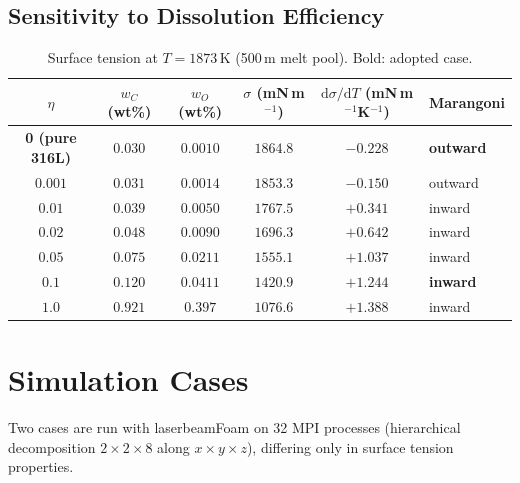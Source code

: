 \documentclass[11pt,a4paper]{article}
\begin{document}
\subsection{Sensitivity to Dissolution Efficiency}
\label{sec:sens}

\begin{table}[h]
\centering
\caption{Surface tension at $T=1873$\,K (500\,\textmu m melt pool). Bold: adopted case.}
\begin{tabular}{cccccl}
\toprule
$\eta$ & $w_C$ (wt\%) & $w_O$ (wt\%) &
  $\sigma$ (mN\,m$^{-1}$) &
  $\mathrm{d}\sigma/\mathrm{d}T$ (mN\,m$^{-1}$K$^{-1}$) &
  Marangoni \\
\midrule
\textbf{0 (pure 316L)}   & $\mathbf{0.030}$ & $\mathbf{0.0010}$ & $\mathbf{1864.8}$ & $\mathbf{-0.228}$ & \textbf{outward} \\
$0.001$         & $0.031$ & $0.0014$ & $1853.3$ & $-0.150$ & outward \\
$0.01$          & $0.039$ & $0.0050$ & $1767.5$ & $+0.341$ & inward \\
$0.02$          & $0.048$ & $0.0090$ & $1696.3$ & $+0.642$ & inward \\
$0.05$          & $0.075$ & $0.0211$ & $1555.1$ & $+1.037$ & inward \\
$\mathbf{0.1}$  & $\mathbf{0.120}$ & $\mathbf{0.0411}$ & $\mathbf{1420.9}$ & $\mathbf{+1.244}$ & \textbf{inward} \\
$1.0$           & $0.921$ & $0.397$  & $1076.6$ & $+1.388$ & inward \\
\bottomrule
\end{tabular}
\end{table}

\section{Simulation Cases}

Two cases are run with laserbeamFoam on 32 MPI processes (hierarchical
decomposition $2\times2\times8$ along $x\times y\times z$), differing only in
surface tension properties.
\end{document}
